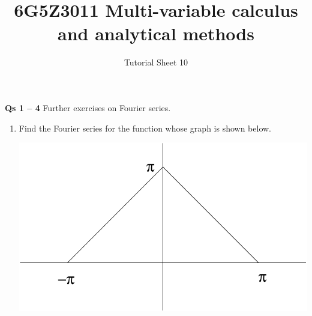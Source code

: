 \documentclass[a4paper]{amsart}
\begin{document}
\title{6G5Z3011 Multi-variable calculus and analytical methods}
\author{Tutorial Sheet 10}
\maketitle

\textbf{Qs 1 -- 4} Further exercises on Fourier series. 

\begin{enumerate}
  \item
Find the Fourier series for the function whose graph is shown below.

\begin{center}
\includegraphics[scale=0.5]{sheet16q1.pdf} 
\end{center}


\end{enumerate}
\end{document}
